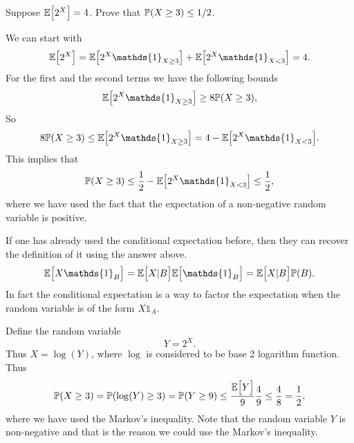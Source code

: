 \begin{problem}
	Suppose $ \mathbb{E}\big[2^X\big]=4 $. Prove that $ \mathbb{P}(X\geq 3)\leq 1/2 $.
\end{problem}
\begin{solution}
	We can start with
	\[ \E{2^X} = \E{2^X\mathds{1}_{X\geq3}} + \E{2^X\mathds{1}_{X<3}} = 4. \]
	For the first and the second terms we have the following bounds
	\[ \E{2^X\mathds{1}_{X\geq3}} \geq 8\prob(X\geq 3), \]
	So 
	\[ 8\prob(X\geq 3) \leq \E{2^X\mathds{1}_{X\geq 3}} = 4 - \E{2^X\mathds{1}_{X<3}}. \]
	This implies that 
	\[ \prob(X\geq 3) \leq \frac{1}{2} - \E{2^X\mathds{1}_{X<3}} \leq \frac{1}{2}, \]
	where we have used the fact that the expectation of a non-negative random variable is positive.
\end{solution}
\begin{remark}
	If one has already used the conditional expectation before, then they can recover the definition of it using the answer above. 
	\[ \E{X\mathds{1}_B} = \E{X|B} \E{\mathds{1}_B} = \E{X|B}\prob(B).  \]
	In fact the conditional expectation is a way to factor the expectation when the random variable is of the form $ X\mathds{1}_A $.
\end{remark}
\begin{solution}
	Define the random variable
	\[ Y = 2^X. \]
	Thus $ X = \log(Y) $, where $ \log $ is considered to be base 2 logarithm function. Thus
	\[ \mathbb{P}(X\geq 3) = \mathbb{P}(\log(Y)\geq 3) = \mathbb{P}(Y\geq 9) \leq \frac{\mathbb{E}\big[Y\big]}{9} \frac{4}{9}\leq \frac{4}{8} = \frac{1}{2}, \]
	where we have used the Markov's inequality. Note that the random variable $ Y $ is non-negative and that is the reason we could use the Markov's inequality.
\end{solution}


